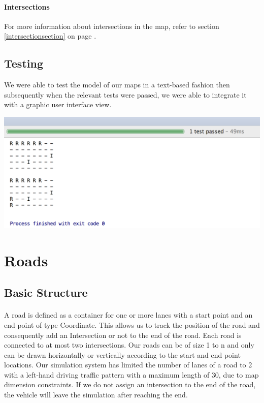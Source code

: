 \documentclass[a4paper,11pt,titlepage]{article}
\begin{document}
\paragraph{Intersections} For more information about intersections in the map, refer to section \ref{intersectionsection} on page \pageref{intersectionsection}.
\subsection{Testing}
We were able to test the model of our maps in a text-based fashion then subsequently when the relevant tests were passed, we were able to integrate it with a graphic user interface view.
\centerline{\includegraphics[scale=0.5]{test_mapgrid}}

\section{Roads}\label{roadsection}
\subsection{Basic Structure}
\paragraph{}
A road is defined as a container for one or more lanes with a start point and an end point of type Coordinate. This allows us to track the position of the road and consequently add an Intersection or not to the end of the road. Each road is connected to at most two intersections. Our roads can be of size 1 to n and only can be drawn horizontally or vertically according to the start and end point locations. Our simulation system has limited the number of lanes of a road to 2 with a left-hand driving traffic pattern with a maximum length of 30, due to map dimension constraints. If we do not assign an intersection to the end of the road, the vehicle will leave the simulation after reaching the end.
\end{document}
